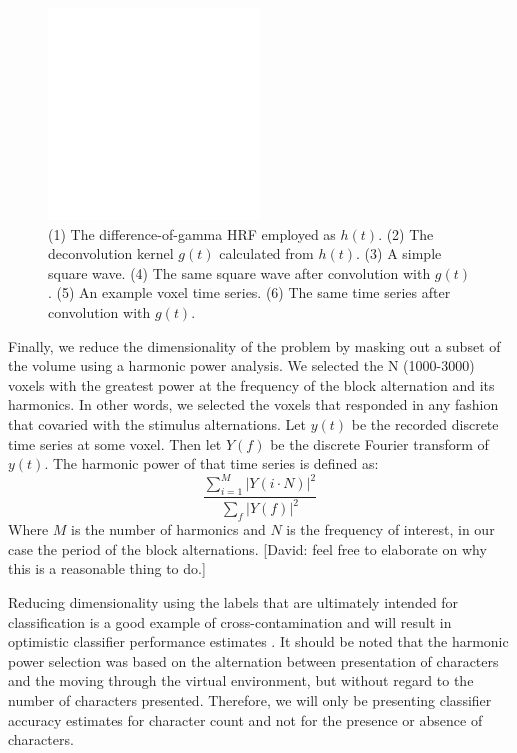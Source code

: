 \documentclass[final]{article}
\begin{document}
\begin{figure}[!htbp]
\centering
\includegraphics[width=0.5\textwidth]{figures/placeholder}
\caption{(1) The difference-of-gamma HRF employed as $h(t)$. (2) The deconvolution kernel $g(t)$ calculated from $h(t)$. (3) A simple square wave. (4) The same square wave after convolution with $g(t)$. (5) An example voxel time series. (6) The same time series after convolution with $g(t)$.}
\label{fig:data-split}
\end{figure}

Finally, we reduce the dimensionality of the problem by masking out a subset of the volume using a harmonic power analysis.
We selected the N (1000-3000) voxels with the greatest power at the frequency of the block alternation and its harmonics.
In other words, we selected the voxels that responded in any fashion that covaried with the stimulus alternations.
Let $y(t)$ be the recorded discrete time series at some voxel.
Then let $Y(f)$ be the discrete Fourier transform of $y(t)$.
The harmonic power of that time series is defined as:
\begin{equation}
\frac{\sum_{i = 1}^{M}{\left|Y(i \cdot N)\right|^{2}}}{\sum_{f}{\left|Y(f)\right|^{2}}}
\end{equation}
Where $M$ is the number of harmonics and $N$ is the frequency of interest, in our case the period of the block alternations.
[David: feel free to elaborate on why this is a reasonable thing to do.]

Reducing dimensionality using the labels that are ultimately intended for classification is a good example of cross-contamination and will result in optimistic classifier performance estimates \cite{CrossContamination}.
It should be noted that the harmonic power selection was based on the alternation between presentation of characters and the moving through the virtual environment, but without regard to the number of characters presented.
Therefore, we will only be presenting classifier accuracy estimates for character count and not for the presence or absence of characters.
\end{document}
